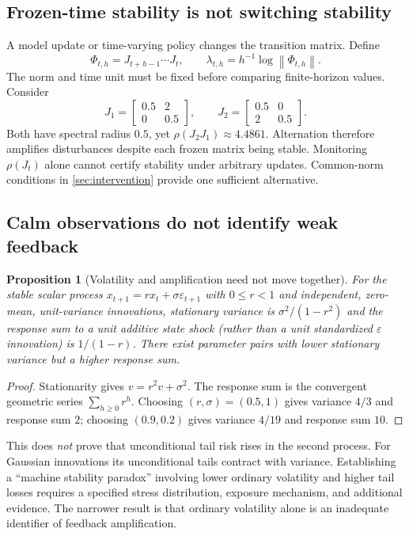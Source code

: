 \documentclass[11pt,a4paper]{article}
\newtheorem{proposition}[theorem]{Proposition}
\theoremstyle{definition}
\theoremstyle{remark}
\newcommand{\norm}[1]{\left\lVert #1\right\rVert}
\begin{document}
\subsection{Frozen-time stability is not switching stability}
A model update or time-varying policy changes the transition matrix. Define
\begin{equation}
 \Phi_{t,h}=J_{t+h-1}\cdots J_t,\qquad
 \lambda_{t,h}=h^{-1}\log\norm{\Phi_{t,h}}.
 \label{eq:product}
\end{equation}
The norm and time unit must be fixed before comparing finite-horizon values. Consider
\begin{equation}
 J_1=\begin{bmatrix}0.5&2\\0&0.5\end{bmatrix},\qquad
 J_2=\begin{bmatrix}0.5&0\\2&0.5\end{bmatrix}.
 \label{eq:switch}
\end{equation}
Both have spectral radius $0.5$, yet $\rho(J_2J_1)\approx4.4861$. Alternation therefore amplifies disturbances despite each frozen matrix being stable. Monitoring $\rho(J_t)$ alone cannot certify stability under arbitrary updates. Common-norm conditions in \cref{sec:intervention} provide one sufficient alternative.

\subsection{Calm observations do not identify weak feedback}
\begin{proposition}[Volatility and amplification need not move together]
\label{prop:vol}
For the stable scalar process $x_{t+1}=r x_t+\sigma\varepsilon_{t+1}$ with $0\leq r<1$ and independent, zero-mean, unit-variance innovations, stationary variance is $\sigma^2/(1-r^2)$ and the response sum to a unit additive state shock (rather than a unit standardized $\varepsilon$ innovation) is $1/(1-r)$. There exist parameter pairs with lower stationary variance but a higher response sum.
\end{proposition}
\begin{proof}
Stationarity gives $v=r^2v+\sigma^2$. The response sum is the convergent geometric series $\sum_{h\geq0}r^h$. Choosing $(r,\sigma)=(0.5,1)$ gives variance $4/3$ and response sum $2$; choosing $(0.9,0.2)$ gives variance $4/19$ and response sum $10$.
\end{proof}
This does \emph{not} prove that unconditional tail risk rises in the second process. For Gaussian innovations its unconditional tails contract with variance. Establishing a ``machine stability paradox'' involving lower ordinary volatility and higher tail losses requires a specified stress distribution, exposure mechanism, and additional evidence. The narrower result is that ordinary volatility alone is an inadequate identifier of feedback amplification.
\end{document}
